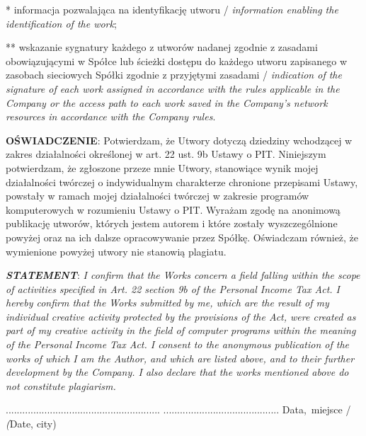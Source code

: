 \documentclass[10pt]{report}
\begin{document}
\begin{ThreePartTable}
		\begin{tablenotes}
			\item[*] informacja pozwalająca na identyfikację utworu / \textit{information enabling the identification of the work};
			\item[**] wskazanie sygnatury każdego z utworów nadanej zgodnie z zasadami obowiązującymi w Spółce lub ścieżki dostępu do każdego utworu zapisanego w zasobach sieciowych Spółki zgodnie z przyjętymi zasadami / \textit{indication of the signature of each work assigned in accordance with the rules applicable in the Company or the access path to each work saved in the Company's network resources in accordance with the Company rules}.
		\end{tablenotes}
	\end{ThreePartTable}
	
	\vspace{1 \baselineskip}
	
	{\textbf{OŚWIADCZENIE}:} {\normalsize Potwierdzam, że Utwory dotyczą dziedziny wchodzącej w zakres działalności określonej w art. 22 ust. 9b Ustawy o PIT. Niniejszym potwierdzam, że zgłoszone przeze mnie Utwory, stanowiące wynik mojej działalności twórczej o indywidualnym charakterze chronione przepisami Ustawy, powstały w ramach mojej działalności twórczej w zakresie programów komputerowych w rozumieniu Ustawy o PIT. Wyrażam zgodę na anonimową publikację utworów, których jestem autorem i które zostały wyszczególnione powyżej oraz na ich dalsze opracowywanie przez Spółkę. Oświadczam również, że wymienione powyżej utwory nie stanowią plagiatu.}\newline

	{\textit{\textbf{STATEMENT}}:} {\small \textit{I confirm that the Works concern a field falling within the scope of activities specified in Art. 22 section 9b of the Personal Income Tax Act. I hereby confirm that the Works submitted by me, which are the result of my individual creative activity protected by the provisions of the Act, were created as part of my creative activity in the field of computer programs within the meaning of the Personal Income Tax Act. I consent to the anonymous publication of the works of which I am the Author, and which are listed above, and to their further development by the Company. I also declare that the works mentioned above do not constitute plagiarism.}}\newline

	\vspace*{\fill}
	\noindent ........................................................ \hfill ..........................................\newline
	 \hfill {\small Data, miejsce / \textit(Date, city)}
\end{document}
